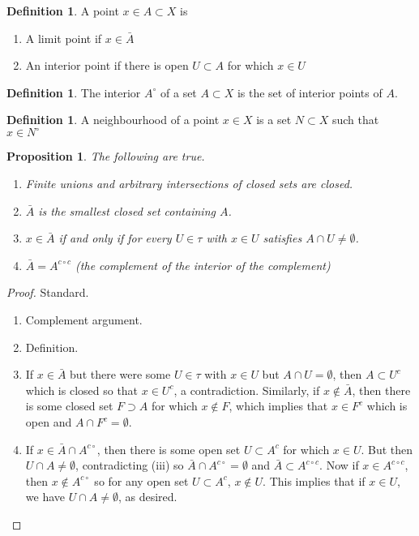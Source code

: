 \documentclass[11pt]{amsart}
\newtheorem{proposition}[theorem]{Proposition}
\theoremstyle{definition}
\newtheorem{definition}[theorem]{Definition}
\numberwithin{equation}{section}
\begin{document}
\begin{definition}
    A point $x\in A\subset X$ is
    \begin{enumerate}
        \item [(i)] A limit point if $x\in\bar A$
        \item [(ii)] An interior point if there is open $U\subset A$ for which $x\in U$
    \end{enumerate}
\end{definition}
\begin{definition}
    The interior $A^\circ$ of a set $A\subset X$ is the set of interior points of $A$.
\end{definition}
\begin{definition}
    A neighbourhood of a point $x\in X$ is a set $N\subset X$ such that $x\in N^\circ$
\end{definition}
\begin{proposition}
    The following are true.
    \begin{enumerate}
        \item [(i)] Finite unions and arbitrary intersections of closed sets are closed.
        \item [(ii)] $\bar A$ is the smallest closed set containing $A$.
        \item [(iii)] $x\in \bar A$ if and only if for every $U\in\tau$ with $x\in U$ satisfies $A\cap U\ne\emptyset$.
        \item [(iv)] $\bar A=A^{c\circ c}$ (the complement of the interior of the complement)
    \end{enumerate}
\end{proposition}
\begin{proof}
    Standard.
    \begin{enumerate}
        \item [(i)] Complement argument.
        \item [(ii)] Definition.
        \item [(iii)] If $x\in\bar A$ but there were some $U\in\tau$ with $x\in U$ but $A\cap U=\emptyset$, then $A\subset U^c$ which is closed so that $x\in U^c$, a contradiction. Similarly, if $x\not\in\bar A$, then there is some closed set $F\supset A$ for which $x\not\in F$, which implies that $x\in F^c$ which is open and $A\cap F^c=\emptyset$.
        \item [(iv)] If $x\in \bar A\cap A^{c\circ}$, then there is some open set $U\subset A^c$ for which $x\in U$. But then $U\cap A\ne\emptyset$, contradicting (iii) so $\bar A\cap A^{c\circ}=\emptyset$ and $\bar A\subset A^{c\circ c}$. Now if $x\in A^{c\circ c}$, then $x\not\in A^{c\circ}$ so for any open set $U\subset A^c$, $x\not\in U$. This implies that if $x\in U$, we have $U\cap A\ne\emptyset$, as desired.
    \end{enumerate}
\end{proof}
\end{document}
